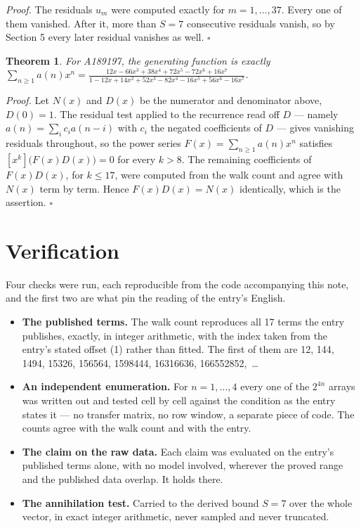 \documentclass[11pt]{article}
\newtheorem{theorem}{Theorem}
\theoremstyle{definition}
\begin{document}
{\itshape Proof.} The residuals $u_m$ were computed exactly for $m = 1,\dots,37$. Every one of them vanished. After it, more than $S = 7$ consecutive residuals vanish, so by Section 5 every later residual vanishes as well. $\square$

\begin{theorem} For A189197, the generating function is exactly $\sum_{n\ge 1} a(n)x^n = \frac{12x - 66x^{3} + 38x^{4} + 72x^{5} - 72x^{6} + 16x^{7}}{1 - 12x + 14x^{2} + 52x^{3} - 82x^{4} - 16x^{5} + 56x^{6} - 16x^{7}}$.\end{theorem}

{\itshape Proof.} Let $N(x)$ and $D(x)$ be the numerator and denominator above, $D(0)=1$. The residual test applied to the recurrence read off $D$ --- namely $a(n) = \sum_i c_i a(n-i)$ with $c_i$ the negated coefficients of $D$ --- gives vanishing residuals throughout, so the power series $F(x)=\sum_{n\ge 1}a(n)x^n$ satisfies $[x^k]\bigl(F(x)D(x)\bigr) = 0$ for every $k > 8$. The remaining coefficients of $F(x)D(x)$, for $k \le 17$, were computed from the walk count and agree with $N(x)$ term by term. Hence $F(x)D(x) = N(x)$ identically, which is the assertion. $\square$

\section{Verification}

Four checks were run, each reproducible from the code accompanying this note, and the first two are what pin the reading of the entry's English.

\begin{itemize}

\item {\bfseries The published terms.} The walk count reproduces all 17 terms the entry publishes, exactly, in integer arithmetic, with the index taken from the entry's stated offset (1) rather than fitted. The first of them are 12, 144, 1494, 15326, 156564, 1598444, 16316636, 166552852,~\dots

\item {\bfseries An independent enumeration.} For $n = 1,\dots,4$ every one of the $2^{4n}$ arrays was written out and tested cell by cell against the condition as the entry states it --- no transfer matrix, no row window, a separate piece of code. The counts agree with the walk count and with the entry.

\item {\bfseries The claim on the raw data.} Each claim was evaluated on the entry's published terms alone, with no model involved, wherever the proved range and the published data overlap. It holds there.

\item {\bfseries The annihilation test.} Carried to the derived bound $S = 7$ over the whole vector, in exact integer arithmetic, never sampled and never truncated.

\end{itemize}
\end{document}
